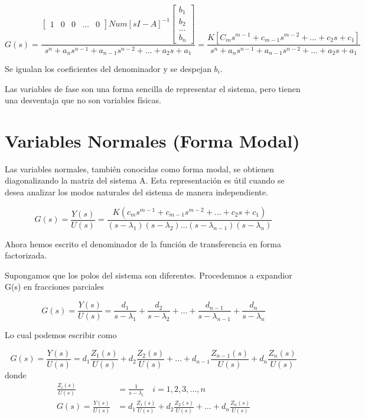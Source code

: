 \documentclass[legalpaper,twocolumn]{article}
\begin{document}
\[
    G(s) = \frac{\begin{bmatrix}
        1 & 0 & 0 & \dots & 0
    \end{bmatrix}Num{[sI - A]^{-1}}\begin{bmatrix}
        b_1   \\
        b_2   \\
        \dots \\
        b_n
    \end{bmatrix}}{s^n + a_n s^{n-1} + a_{n-1} s^{n-2} + \dots + a_2 s + a_1}
    = \frac{K[C_m s^{m-1} + c_{m-1} s^{m-2} + \dots + c_2 s + c_1]}{s^n + a_n s^{n-1} + a_{n-1} s^{n-2} + \dots + a_2 s + a_1}
\]

Se igualan los coeficientes del denominador y se despejan $b_i$.

Las variables de fase son una forma sencilla de representar el sistema, pero tienen una desventaja que no son variables físicas.

\section*{Variables Normales (Forma Modal)}

Las variables normales, también conocidas como forma modal, se obtienen diagonalizando la matriz del sistema A. Esta representación es útil cuando se desea analizar los modos naturales del sistema de manera independiente.

\[
    G(s) = \frac{Y(s)}{U(s)} = \frac{K(c_m s^{m-1} + c_{m-1} s^{m-2} + \dots + c_2 s + c_1)}{(s - \lambda_1)(s - \lambda_2) \dots (s - \lambda_{n-1})(s - \lambda_n)}
\]

Ahora hemos escrito el denominador de la función de transferencia en forma factorizada.

Supongamos que los polos del sistema son diferentes. Procedemnos a expandior G(s) en fracciones parciales

\[
    G(s) = \frac{Y(s)}{U(s)} = \frac{d_1}{s - \lambda_1} + \frac{d_2}{s - \lambda_2} + \dots + \frac{d_{n-1}}{s - \lambda_{n-1}} + \frac{d_n}{s - \lambda_n}
\]

Lo cual podemos escribir como

\[
    G(s) = \frac{Y(s)}{U(s)} = d_1 \frac{Z_1(s)}{U(s)} + d_2 \frac{Z_2(s)}{U(s)} + \dots + d_{n-1} \frac{Z_{n-1}(s)}{U(s)} + d_n \frac{Z_n(s)}{U(s)}
\]
donde
\[
    \begin{aligned}
        \frac{Z_i(s)}{U(s)}      & = \frac{1}{s - \lambda_i} \quad i = 1, 2, 3, \dots, n                                 \\
        G(s) = \frac{Y(s)}{U(s)} & = d_1 \frac{Z_1(s)}{U(s)} + d_2 \frac{Z_2(s)}{U(s)} + \dots + d_n \frac{Z_n(s)}{U(s)}
    \end{aligned}
\]
\end{document}
